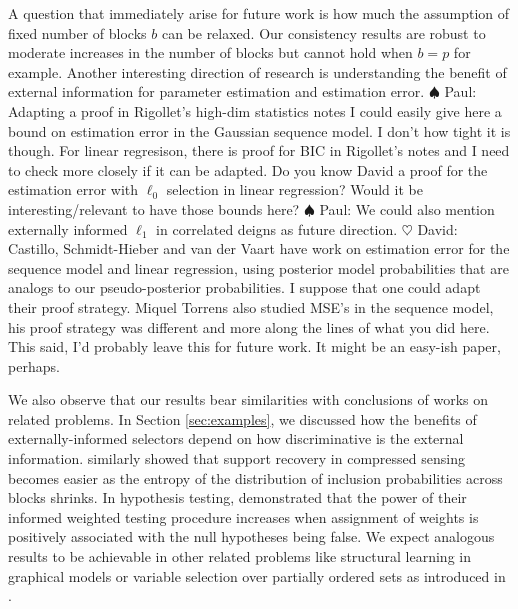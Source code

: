 \documentclass[aos]{imsart}
\theoremstyle{plain}
\newcommand{\david}[1]{{\small{\color{blue} \sf $\heartsuit$ David: #1}}}
\newcommand{\paul}[1]{{\small{\color{green} \sf $\spadesuit$ Paul: #1}}}
\begin{document}
A question that immediately arise for future work is how much the assumption of fixed number of blocks $b$ can be relaxed. Our consistency results are robust to moderate increases in the number of blocks but cannot hold when $b=p$ for example. Another interesting direction of research is understanding the benefit of external information for parameter estimation and estimation error. \paul{Adapting a proof in Rigollet's high-dim statistics notes I could easily give here a bound on estimation error in the Gaussian sequence model. I don't how tight it is though. For linear regresison, there is proof for BIC in Rigollet's notes and I need to check more closely if it can be adapted. Do you know David a proof for the estimation error with $\ell_0$ selection in linear regression? Would it be interesting/relevant to have those bounds here?} \paul{We could also mention externally informed $\ell_1$ in correlated deigns as future direction.}
\david{Castillo, Schmidt-Hieber and van der Vaart have work on estimation error for the sequence model and linear regression, using posterior model probabilities that are analogs to our pseudo-posterior probabilities. I suppose that one could adapt their proof strategy. Miquel Torrens also studied MSE's in the sequence model, his proof strategy was different and more along the lines of what you did here. This said, I'd probably leave this for future work. It might be an easy-ish paper, perhaps.}

We also observe that our results bear similarities with conclusions of works on related problems. In Section \ref{sec:examples}, we discussed how the benefits of externally-informed selectors depend on how discriminative is the external information. \cite{scarlett2012compressed} similarly showed that support recovery in compressed sensing becomes easier as the entropy of the distribution of inclusion probabilities across blocks shrinks. In hypothesis testing, \cite{genovese2006} demonstrated that the power of their informed weighted testing procedure increases when assignment of weights is positively associated with the null hypotheses being false. We expect analogous results to be achievable in other related problems like structural learning in graphical models or variable selection over partially ordered sets as introduced in \cite{taeb}. 

\begin{acks}[Acknowledgments]
\end{acks}
\end{document}
